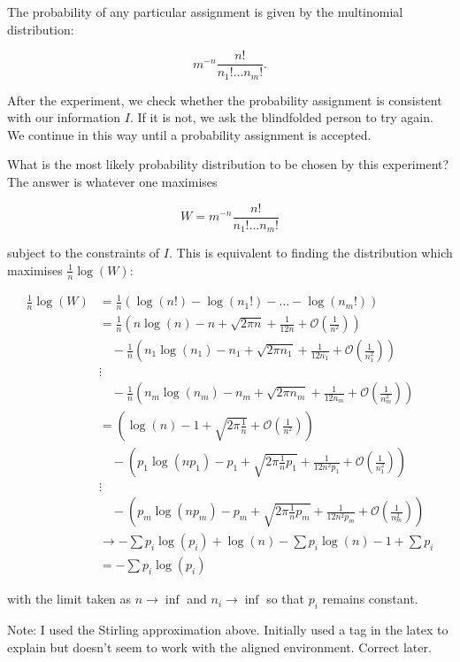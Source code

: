 \documentclass[
]{book}
\begin{document}
The probability of any particular assignment is given by the multinomial distribution:

\[
m^{-n} \frac{n!}{n_1! \dots n_m!}.
\]

After the experiment, we check whether the probability assignment is consistent with our information \(I\). If it is not, we ask the blindfolded person to try again. We continue in this way until a probability assignment is accepted.

What is the most likely probability distribution to be chosen by this experiment? The answer is whatever one maximises

\[
W = m^{-n} \frac{n!}{n_1! \dots n_m!}
\]

subject to the constraints of \(I\). This is equivalent to finding the distribution which maximises \(\frac{1}{n} \log(W)\):

\[
\begin{aligned}
\frac{1}{n} \log(W) &= \frac{1}{n} \left( \log(n!) - \log(n_1!) - \dots - \log(n_m!) \right) \\
 &= \frac{1}{n} \left( n \log(n) - n + \sqrt{2 \pi n} + \frac{1}{12n} + \mathcal{O}\left(\frac{1}{n^2}\right) \right) \\ 
 &\quad - \frac{1}{n} \left( n_1 \log(n_1) - n_1 + \sqrt{2 \pi n_1} + \frac{1}{12n_1} + \mathcal{O}\left(\frac{1}{n_1^2}\right)  \right) \\
 &\vdots \\
 &\quad- \frac{1}{n} \left( n_m \log(n_m) - n_m + \sqrt{2 \pi n_m} + \frac{1}{12n_m} + \mathcal{O}\left(\frac{1}{n_m^2}\right)  \right)  \\
 &= \left( \log(n) - 1 + \sqrt{2 \pi \frac{1}{n}} + \mathcal{O}\left(\frac{1}{n^2}\right) \right) \\ 
 &\quad- \left( p_1 \log(np_1) - p_1 + \sqrt{2 \pi \frac{1}{n}p_1} + \frac{1}{12n^2p_1} + \mathcal{O}\left(\frac{1}{n_1^2}\right)  \right) \\
 &\vdots \\
 &\quad- \left( p_m \log(np_m) - p_m + \sqrt{2 \pi \frac{1}{n}p_m} + \frac{1}{12n^2p_m} + \mathcal{O}\left(\frac{1}{n_m^2}\right)  \right) \\
 &\to -\sum p_i \log(p_i) +\log(n) -\sum p_i \log(n) - 1 + \sum p_i \\
 &= -\sum p_i \log(p_i)
\end{aligned}
\]

with the limit taken as \(n \to \inf\) and \(n_i \to \inf\) so that \(p_i\) remains constant.

Note: I used the Stirling approximation above. Initially used a tag in the latex to explain but doesn't seem to work with the aligned environment. Correct later.
\end{document}
